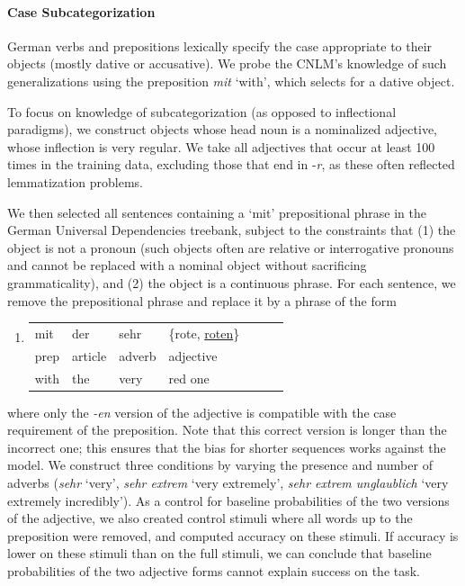 \paragraph{Case Subcategorization}
German verbs and prepositions lexically specify the case appropriate to their objects (mostly dative or accusative).
We probe the CNLM's knowledge of such generalizations using the preposition \textit{mit} `with', which selects for a dative object.

To focus on knowledge of subcategorization (as opposed to inflectional paradigms), we construct objects whose head noun is a nominalized adjective, whose inflection is very regular.
We take all adjectives that occur at least 100 times in the training data, excluding those that end in -\emph{r}, as these often reflected lemmatization problems.

We then selected all sentences containing a `mit' prepositional phrase in the German Universal Dependencies treebank, subject to the constraints that (1) the object is not a pronoun (such objects often are relative or interrogative pronouns and cannot be replaced with a nominal object without sacrificing grammaticality), and (2) the object is a continuous phrase.
For each sentence, we remove the prepositional phrase and replace it by a phrase of the form
\begin{enumerate}[label={(\arabic*)}]
	\item \begin{tabular}[t]{lllllll}
	mit & der & sehr& \{rote, \underline{roten}\} \\
	prep & article  & adverb & adjective \\
	with & the & very  & red one 
\end{tabular}
\end{enumerate}
where only the \emph{-en} version of the adjective is compatible with the case requirement of the preposition.
Note that this correct version is longer than the incorrect one; this ensures that the bias for shorter sequences works against the model.
We construct three conditions by varying the presence and number of adverbs (\emph{sehr} `very', \emph{sehr extrem} `very extremely', \emph{sehr extrem unglaublich} `very extremely incredibly').
As a control for baseline probabilities of the two versions of the adjective, we also created control stimuli where all words up to the preposition were removed, and computed accuracy on these stimuli.
If accuracy is lower on these stimuli than on the full stimuli, we can conclude that baseline probabilities of the two adjective forms cannot explain success on the task.

